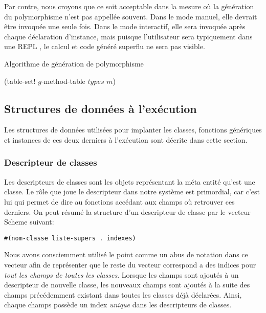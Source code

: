 \documentclass[letterpaper,12pt]{book}
\begin{document}
      Par contre, nous croyons que ce soit acceptable dans la mesure
      où la génération du polymorphisme n'est pas appellée
      souvent. Dans le mode manuel, elle devrait être invoquée une
      seule fois. Dans le mode interactif, elle sera invoquée après
      chaque déclaration d'instance, mais puisque l'utilisateur sera
      typiquement dans une \og REPL \fg, le calcul et code généré
      superflu ne sera pas visible. 

      \begin{algorithm}
        \caption{Algorithme de génération de polymorphisme}
        \label{algo-poly}
        \begin{algorithmic}
              \STATE (table-set! $g$-method-table $types$ $m$)
            \ENDFOR
          \ENDFOR
        \ENDFOR
        \end{algorithmic}
      \end{algorithm}
      

  \subsection{Structures de données à l'exécution}
    Les structures de données utilisées pour implanter les classes,
    fonctions génériques et instances de ces deux derniers à
    l'exécution sont décrite dans cette section.
  
    \subsubsection{Descripteur de classes}
      Les descripteurs de classes sont les objets représentant la méta
      entité qu'est une classe. Le rôle que joue le descripteur dans
      notre système est primordial, car c'est lui qui permet de dire
      au fonctions accédant aux champs où retrouver ces derniers. On
      peut résumé la structure d'un descripteur de classe par le
      vecteur Scheme suivant:

      \begin{lstlisting}
#(nom-classe liste-supers . indexes)
      \end{lstlisting}

      Nous avons consciemment utilisé le point comme un abus de
      notation dans ce vecteur afin de représenter que le reste du
      vecteur correspond a des indices pour \emph{tout les champs de
        toutes les classes}. Lorsque les champs sont ajoutés à un
      descripteur de nouvelle classe, les nouveaux champs sont ajoutés
      à la suite des champs précédemment existant dans toutes les
      classes déjà déclarées. Ainsi, chaque champs possède un index
      \emph{unique} dans les descripteurs de classes.
\end{document}
